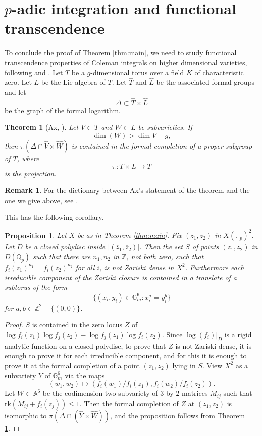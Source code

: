 \documentclass{amsart}
\def\Z{\mathbb Z}
\def\Q{\mathbb Q}
\newcommand{\rk}{\mathrm{rk}}
\newtheorem{theorem}{Theorem}
\newtheorem{proposition}{Proposition}
\theoremstyle{definition}
\newtheorem{remark}{Remark}
\newcommand{\F}{\mathbb{F}}
\begin{document}
\section{$p$-adic integration and functional transcendence}
To conclude the proof of Theorem \ref{thm:main}, we need to study functional transcendence properties of Coleman integrals on higher dimensional varieties, following \cite{d:unlikely} and \cite{hast:ax}. Let $T$ be a $g$-dimensional torus over a field $K$ of characteristic zero. Let $L$ be the Lie algebra of $T$. Let $\widehat{T}$ and $\widehat{L}$ be the associated formal groups and let 
\[
\Delta \subset \widehat{T}\times \widehat{L}
\]
be the graph of the formal logarithm.
\begin{theorem}[Ax, \cite{ax1971schanuel}]\label{thm:AS}
Let $V\subset T$ and $W\subset L$ be subvarieties.
If
\[
\dim (W)>\dim V-g,
\]
then $\pi (\Delta \cap \widehat{V}\times \widehat{W})$ is contained in the formal completion of a proper subgroup of $T$, where
\[
\pi :T\times L\to T
\]
is the projection.
\end{theorem}
\begin{remark}
For the dictionary between Ax's statement of the theorem and the one we give above, see \cite{tsimerman:unlikely}.
\end{remark}

This has the following corollary.
\begin{proposition}\label{prop:AStoC}
Let $X$ be as in Theorem \ref{thm:main}. Fix $(\overline{z}_1 ,\overline{z}_2 )$ in $X(\overline{\F }_p )^2 $. Let $D$ be a closed polydisc inside $](\overline{z}_1 ,\overline{z}_2 )[$. Then the set $S$ of points $(z_1 ,z_2 )$ in $D(\overline{\Q }_p )$ such that there are $n_1 ,n_2 $ in $\Z$, not both zero, such that $f_i (z_1 )^{n_1 }=f_i (z_2 )^{n_2 }$ for all $i$, is not Zariski dense in $X^2 $. Furthermore each irreducible component of the Zariski closure is contained in a translate of a subtorus of the form 
\[
\{ (x_i ,y_i )\in \mathbb{G}_m ^6 :x_i ^{a }=  y_i ^{b} \}
\]
for $a,b \in \Z ^2 -\{ (0,0)\}$.
\end{proposition}
\begin{proof}
$S$ is contained in the zero locus $Z$ of $\log f_i (z_1 )\log f_j (z_2 )-\log f_j (z_1 )\log f_i (z_2 )$. Since $\log (f_i )|_D$ is a rigid analytic function on a closed polydisc, to prove that $Z$ is not Zariski dense, it is enough to prove it for each irreducible component, and for this it is enough to prove it at the formal completion of a point $(z_1 ,z_2 )$ lying in $S$. View $X^2$ as a subvariety $Y$ of $\mathbb{G}_m ^6$ via the maps
\[
(w_1 ,w_2 )\mapsto (f_i (w_1 )/f_i (z_1 ),f_i (w_2 )/f_i (z_2 )).
\]
Let $W\subset \mathbb{A}^6$ be the codimension two subvariety of $3$ by $2$ matrices $M_{ij}$ such that $\rk (M_{ij}+f_i (z_j ))\leq 1$. Then the formal completion of $Z$ at $(z_1 ,z_2 )$ is isomorphic to $\pi (\Delta \cap (\widehat{Y}\times \widehat{W}))$, and the proposition follows from Theorem \ref{thm:AS}.
\end{proof}
\end{document}
